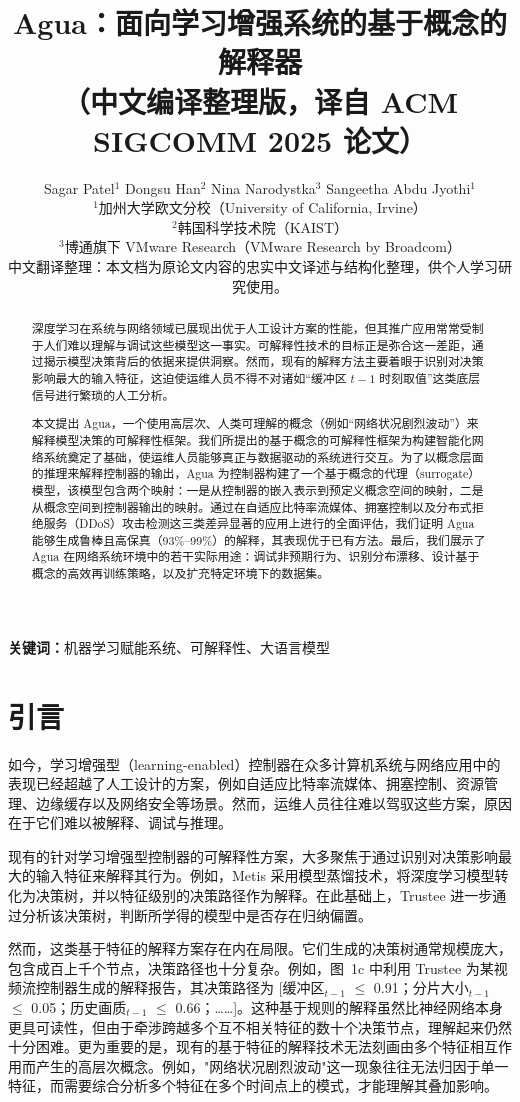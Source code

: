 \documentclass[11pt,a4paper]{article}
\title{Agua：面向学习增强系统的基于概念的解释器\\
\large（中文编译整理版，译自 ACM SIGCOMM 2025 论文）}
\author{Sagar Patel$^{1}$ \quad Dongsu Han$^{2}$ \quad Nina Narodystka$^{3}$ \quad Sangeetha Abdu Jyothi$^{1}$\\[4pt]
\small $^{1}$加州大学欧文分校（University of California, Irvine）\\
\small $^{2}$韩国科学技术院（KAIST）\\
\small $^{3}$博通旗下 VMware Research（VMware Research by Broadcom）\\[6pt]
\small 中文翻译整理：本文档为原论文内容的忠实中文译述与结构化整理，供个人学习研究使用。}
\date{}
\begin{document}
\maketitle

\begin{abstract}
深度学习在系统与网络领域已展现出优于人工设计方案的性能，但其推广应用常常受制于人们难以理解与调试这些模型这一事实。可解释性技术的目标正是弥合这一差距，通过揭示模型决策背后的依据来提供洞察。然而，现有的解释方法主要着眼于识别对决策影响最大的输入特征，这迫使运维人员不得不对诸如“缓冲区 $t-1$ 时刻取值”这类底层信号进行繁琐的人工分析。

本文提出 Agua，一个使用高层次、人类可理解的概念（例如“网络状况剧烈波动”）来解释模型决策的可解释性框架。我们所提出的基于概念的可解释性框架为构建智能化网络系统奠定了基础，使运维人员能够真正与数据驱动的系统进行交互。为了以概念层面的推理来解释控制器的输出，Agua 为控制器构建了一个基于概念的代理（surrogate）模型，该模型包含两个映射：一是从控制器的嵌入表示到预定义概念空间的映射，二是从概念空间到控制器输出的映射。通过在自适应比特率流媒体、拥塞控制以及分布式拒绝服务（DDoS）攻击检测这三类差异显著的应用上进行的全面评估，我们证明 Agua 能够生成鲁棒且高保真（93\%--99\%）的解释，其表现优于已有方法。最后，我们展示了 Agua 在网络系统环境中的若干实际用途：调试非预期行为、识别分布漂移、设计基于概念的高效再训练策略，以及扩充特定环境下的数据集。
\end{abstract}

\noindent\textbf{关键词：}机器学习赋能系统、可解释性、大语言模型

\section{引言}

如今，学习增强型（learning-enabled）控制器在众多计算机系统与网络应用中的表现已经超越了人工设计的方案，例如自适应比特率流媒体、拥塞控制、资源管理、边缘缓存以及网络安全等场景。然而，运维人员往往难以驾驭这些方案，原因在于它们难以被解释、调试与推理。

现有的针对学习增强型控制器的可解释性方案，大多聚焦于通过识别对决策影响最大的输入特征来解释其行为。例如，Metis 采用模型蒸馏技术，将深度学习模型转化为决策树，并以特征级别的决策路径作为解释。在此基础上，Trustee 进一步通过分析该决策树，判断所学得的模型中是否存在归纳偏置。

然而，这类基于特征的解释方案存在内在局限。它们生成的决策树通常规模庞大，包含成百上千个节点，决策路径也十分复杂。例如，图~1c 中利用 Trustee 为某视频流控制器生成的解释报告，其决策路径为 [缓冲区$_{t-1}$ $\leq$ 0.91；分片大小$_{t-1}$ $\leq$ 0.05；历史画质$_{t-1}$ $\leq$ 0.66；……]。这种基于规则的解释虽然比神经网络本身更具可读性，但由于牵涉跨越多个互不相关特征的数十个决策节点，理解起来仍然十分困难。更为重要的是，现有的基于特征的解释技术无法刻画由多个特征相互作用而产生的高层次概念。例如，"网络状况剧烈波动"这一现象往往无法归因于单一特征，而需要综合分析多个特征在多个时间点上的模式，才能理解其叠加影响。
\end{document}
